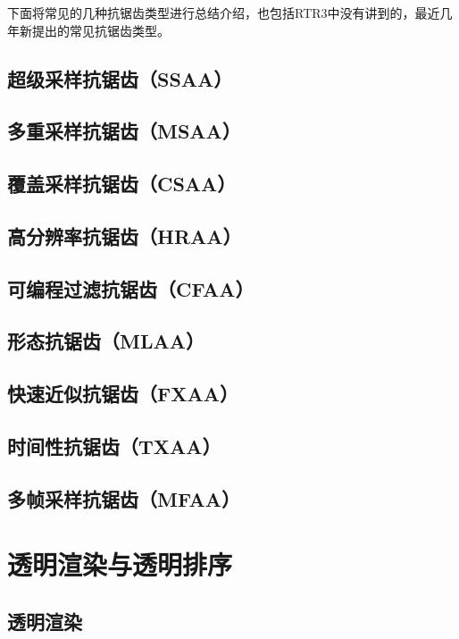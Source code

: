 \documentclass[UTF8,a4paper,12pt]{ctexbook}
\begin{document}
		下面将常见的几种抗锯齿类型进行总结介绍，也包括RTR3中没有讲到的，最近几年新提出的常见抗锯齿类型。
		
		\subsection{超级采样抗锯齿（SSAA）}
		
		\subsection{多重采样抗锯齿（MSAA）}
		
		\subsection{覆盖采样抗锯齿（CSAA）}
		
		\subsection{高分辨率抗锯齿（HRAA）}
		
		\subsection{可编程过滤抗锯齿（CFAA）}
		
		\subsection{形态抗锯齿（MLAA）}
		
		\subsection{快速近似抗锯齿（FXAA）}
		
		\subsection{时间性抗锯齿（TXAA）}
		
		\subsection{多帧采样抗锯齿（MFAA）}
		
	\section{透明渲染与透明排序}
		\subsection{透明渲染}
		
\end{document}
